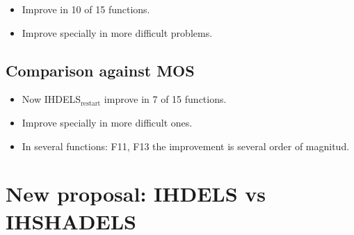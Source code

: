 \documentclass[11pt]{article}
\begin{document}
\begin{itemize}
\item Improve in 10 of 15 functions.
\item Improve specially in more difficult problems.
\end{itemize}

\subsection{Comparison against MOS}
\label{sec:org6a26c8a}



\begin{itemize}
\item Now IHDELS\(_{\text{restart}}\) improve in 7 of 15 functions.
\item Improve specially in more difficult ones.
\item In several functions: F11, F13 the improvement is several order of magnitud.
\end{itemize}

\section{New proposal:  IHDELS vs IHSHADELS}
\label{sec:orgb4c976e}
\end{document}
